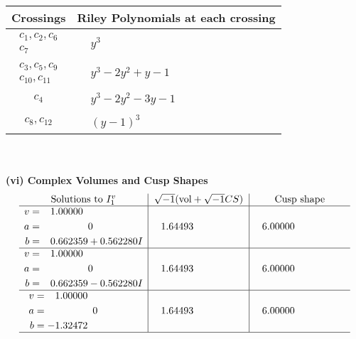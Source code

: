 \documentclass[1p]{elsarticle_modified}
\theoremstyle{definition}
\newcommand{\I}{\sqrt{-1}}
\begin{document}
\begin{tabular}{m{50pt}|m{274pt}}
Crossings & \hspace{64pt}Riley Polynomials at each crossing \\
\hline $$\begin{aligned}c_{1},c_{2},c_{6}\\c_{7}\end{aligned}$$&$\begin{aligned}
&y^3
\end{aligned}$\\
\hline $$\begin{aligned}c_{3},c_{5},c_{9}\\c_{10},c_{11}\end{aligned}$$&$\begin{aligned}
&y^3-2 y^2+y-1
\end{aligned}$\\
\hline $$\begin{aligned}c_{4}\end{aligned}$$&$\begin{aligned}
&y^3-2 y^2-3 y-1
\end{aligned}$\\
\hline $$\begin{aligned}c_{8},c_{12}\end{aligned}$$&$\begin{aligned}
&(y-1)^3
\end{aligned}$\\
\hline
\end{tabular}\\~\\
\newpage\flushleft \textbf{(vi) Complex Volumes and Cusp Shapes}
$$\begin{array}{c|c|c}  
\text{Solutions to }I^v_{1}& \I (\text{vol} + \sqrt{-1}CS) & \text{Cusp shape}\\
 \hline 
\begin{aligned}
v &= \phantom{-}1.00000\phantom{ +0.000000I} \\
a &= \phantom{-0.000000 } 0 \\
b &= \phantom{-}0.662359 + 0.562280 I\end{aligned}
 & \phantom{-}1.64493\phantom{ +0.000000I} & \phantom{-}6.00000\phantom{ +0.000000I} \\ \hline\begin{aligned}
v &= \phantom{-}1.00000\phantom{ +0.000000I} \\
a &= \phantom{-0.000000 } 0 \\
b &= \phantom{-}0.662359 - 0.562280 I\end{aligned}
 & \phantom{-}1.64493\phantom{ +0.000000I} & \phantom{-}6.00000\phantom{ +0.000000I} \\ \hline\begin{aligned}
v &= \phantom{-}1.00000\phantom{ +0.000000I} \\
a &= \phantom{-0.000000 } 0 \\
b &= -1.32472\phantom{ +0.000000I}\end{aligned}
 & \phantom{-}1.64493\phantom{ +0.000000I} & \phantom{-}6.00000\phantom{ +0.000000I}\\
 \hline 
 \end{array}$$\newpage\newpage\renewcommand{\arraystretch}{1}
\end{document}

